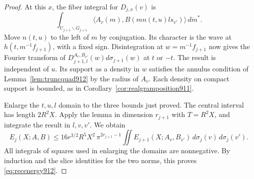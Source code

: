 \documentclass[a4paper,11pt]{article}
\theoremstyle{definition}
\theoremstyle{remark}
\numberwithin{equation}{section}
\begin{document}
\begin{proof}
At this \(x\), the fiber integral for \(D_{j,x}(v)\) is
\[
 \int_{U_{j+1}\backslash G_{j+1}}
       \langle A_v(m),B(m n(t,u)l s_{v'})\rangle\,d\dot m^* .
\]
Move \(n(t,u)\) to the left of \(m\) by conjugation. Its
character is the wave at \(h(t,m^{-1}f_{j+1})\), with a fixed
sign. Disintegration at \(w=m^{-1}f_{j+1}\) now gives the
Fourier transform of \(D_{j+1,l}^{A_v,B_{v'}}(w)d\sigma_{j+1}(w)\)
at \(t\) or \(-t\). The result is independent of \(u\).
Its support as a density in \(w\) satisfies the annulus
condition of Lemma~\ref{lem:truncquad912} by the radius of
\(A_v\). Each density on compact support is bounded, as in
Corollary~\ref{cor:realgramposition911}.

Enlarge the \(t,u,l\) domain to the three bounds just proved.
The central interval has length \(2R^2X\). Apply the lemma in
dimension \(r_{j+1}\) with \(T=R^2X\), and integrate the
result in \(l,v,v'\). We obtain
\[
 E_j(X;A,B)\le
 16r^{3/2}R^5X^2\,\pi^{2r_{j+1}-1}
 \iint E_{j+1}(X;A_v,B_{v'})\,d\sigma_j(v)\,d\sigma_j(v').
\]
All integrals of squares used in enlarging the domains are
nonnegative. By induction and the slice identities for the
two norms, this proves \eqref{eq:recenergy912}.
\end{proof}
\end{document}
